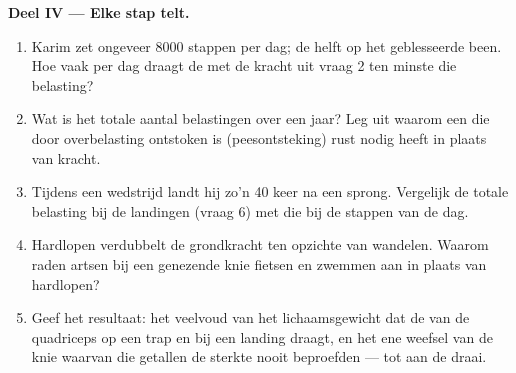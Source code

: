 \begin{problem}
\medskip
\noindent\textbf{Deel IV --- Elke stap telt.}
\begin{enumerate}[resume]
  \item Karim zet ongeveer 8000 stappen per dag; de helft op het geblesseerde
        been. Hoe vaak per dag draagt de  met de kracht uit vraag 2
        ten minste die belasting?
  \item Wat is het totale aantal belastingen over een jaar? Leg uit
        waarom een  die door overbelasting ontstoken is
        (peesontsteking) rust nodig heeft in plaats van kracht.
  \item Tijdens een wedstrijd landt hij zo'n 40 keer na een sprong.
        Vergelijk de totale belasting bij de landingen (vraag 6) met die
        bij de stappen van de dag.
  \item Hardlopen verdubbelt de grondkracht ten opzichte van wandelen.
        Waarom raden artsen bij een genezende knie fietsen en zwemmen aan
        in plaats van hardlopen?
  \item Geef het resultaat: het veelvoud van het lichaamsgewicht dat de
         van de quadriceps op een trap en bij een landing draagt, en
        het ene weefsel van de knie waarvan die getallen de sterkte nooit
        beproefden --- tot aan de draai.
\end{enumerate}
\end{problem}
